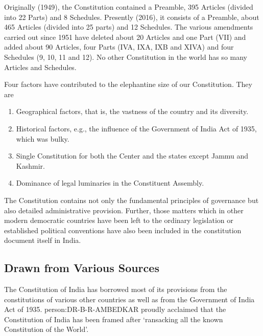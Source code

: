 \begin{multicol}{2}
Originally (1949), the Constitution contained a Preamble, 395 Articles (divided into 22 Parts) and 8 Schedules. Presently (2016), it consists of a Preamble, about 465 Articles (divided into 25 parts) and 12 Schedules. The various amendments carried out since 1951 have deleted about 20 Articles and one Part (VII) and added about 90 Articles, four Parts (IVA, IXA, IXB and XIVA) and four Schedules (9, 10, 11 and 12). No other Constitution in the world has so many Articles and Schedules.

Four factors have contributed to the elephantine size of our Constitution. They are

\renewcommand{\labelenumi}{\textbf{(\alph{enumi})}}
\begin{enumerate}
  \item Geographical factors, that is, the vastness of the country and its diversity.
  \item Historical factors, e.g., the influence of the Government of India Act of 1935, which was bulky.
  \item Single Constitution for both the Center and the states except Jammu and Kashmir.
  \item Dominance of legal luminaries in the Constituent Assembly.
\end{enumerate}

The Constitution contains not only the fundamental principles of governance but also detailed administrative provision. Further, those matters which in other modern democratic countries have been left to the ordinary legislation or established political conventions have also been included in the constitution document itself in India.

\subsection{Drawn from Various Sources}

The Constitution of India has borrowed most of its provisions from the constitutions of various other countries as well as from the Government of India Act of 1935. \gls{person:DR-B-R-AMBEDKAR} proudly acclaimed that the Constitution of India has been framed after `ransacking all the known Constitution of the World'.


\end{multicol}
